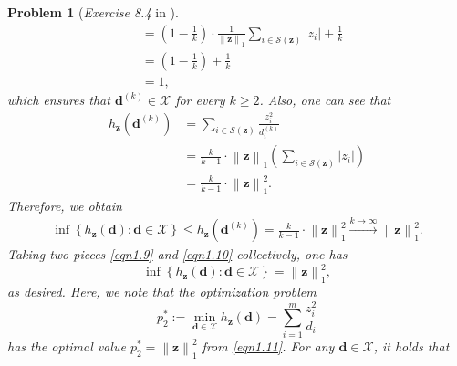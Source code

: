 \documentclass[11pt]{article}
\newtheorem{problem}{Problem}
\numberwithin{equation}{problem}
\begin{document}
\begin{problem} [\emph{Exercise 8.4} in \cite{calafiore2014optimization}]
{\begin{equation*}
\begin{split}
        &= \left( 1 - \frac{1}{k} \right) \cdot \frac{1}{\left\| \mathbf{z} \right\|_1} \sum_{i \in \mathcal{S}(\mathbf{z})} \left| z_i \right| + \frac{1}{k} \\
        &= \left( 1 - \frac{1}{k} \right) + \frac{1}{k} \\
        &= 1,
    \end{split}
\end{equation*}
which ensures that $\mathbf{d}^{(k)} \in \mathcal{X}$ for every $k \geq 2$. Also, one can see that
\begin{equation*}
    \begin{split}
        h_{\mathbf{z}} \left( \mathbf{d}^{(k)} \right) &=
        \sum_{i \in \mathcal{S}(\mathbf{z})} \frac{z_{i}^2}{d_{i}^{(k)}} \\
        &= \frac{k}{k-1} \cdot \left\| \mathbf{z} \right\|_1 \left( \sum_{i \in \mathcal{S}(\mathbf{z})} \left| z_i \right| \right) \\
        &= \frac{k}{k-1} \cdot \left\| \mathbf{z} \right\|_{1}^2.
    \end{split}
\end{equation*}
Therefore, we obtain
\begin{equation}
    \label{eqn1.10}
    \begin{split}
        \inf \left\{ h_{\mathbf{z}}(\mathbf{d}) : \mathbf{d} \in \mathcal{X} \right\} \leq h_{\mathbf{z}} \left( \mathbf{d}^{(k)} \right) = \frac{k}{k-1} \cdot \left\| \mathbf{z} \right\|_{1}^2
        \stackrel{k \to \infty}{\longrightarrow} \left\| \mathbf{z} \right\|_{1}^2.
    \end{split}
\end{equation}
Taking two pieces \eqref{eqn1.9} and \eqref{eqn1.10} collectively, one has
\begin{equation}
    \label{eqn1.11}
    \inf \left\{ h_{\mathbf{z}}(\mathbf{d}) : \mathbf{d} \in \mathcal{X} \right\} = \left\| \mathbf{z} \right\|_{1}^2,
\end{equation}
as desired. Here, we note that the optimization problem
\begin{equation}
    \label{eqn1.12}
    p_{2}^* := \min_{\mathbf{d} \in \mathcal{X}}
    h_{\mathbf{z}}(\mathbf{d}) = \sum_{i=1}^{m} \frac{z_{i}^2}{d_i}
\end{equation}
has the optimal value $p_{2}^* = \left\| \mathbf{z} \right\|_{1}^2$ from \eqref{eqn1.11}. For any $\mathbf{d} \in \mathcal{X}$, it holds that
\begin{equation}
    \label{eqn1.13}
    \begin{split}

\end{split}
\end{equation}}
\end{problem}
\end{document}
